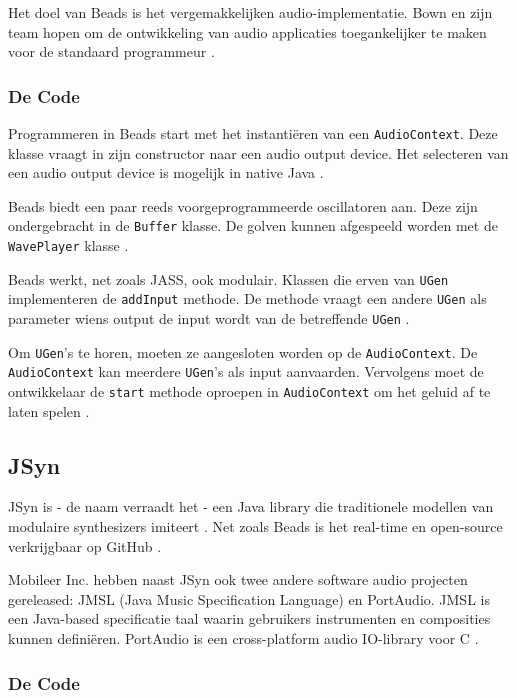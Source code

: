 Het doel van Beads is het vergemakkelijken audio-implementatie. Bown en zijn team hopen om de ontwikkeling van audio applicaties toegankelijker te maken voor de standaard programmeur \autocite{beads2}.

\subsubsection*{De Code}

Programmeren in Beads start met het instantiëren van een \verb+AudioContext+. Deze klasse vraagt in zijn constructor naar een audio output device. Het selecteren van een audio output device is mogelijk in native Java \autocite{beadsdocs}.

Beads biedt een paar reeds voorgeprogrammeerde oscillatoren aan. Deze zijn ondergebracht in de \verb+Buffer+ klasse. De golven kunnen afgespeeld worden met de \verb+WavePlayer+ klasse \autocite{beadsdocs}.

Beads werkt, net zoals JASS, ook modulair. Klassen die erven van \verb+UGen+ implementeren de \verb+addInput+ methode. De methode vraagt een andere \verb+UGen+ als parameter wiens output de input wordt van de betreffende \verb+UGen+ \autocite{beadsdocs}.

Om \verb+UGen+'s te horen, moeten ze aangesloten worden op de \verb+AudioContext+. De \verb+AudioContext+ kan meerdere \verb+UGen+'s als input aanvaarden. Vervolgens moet de ontwikkelaar de \verb+start+ methode oproepen in \verb+AudioContext+ om het geluid af te laten spelen \autocite{beadsdocs}.

\subsection{JSyn}

JSyn is - de naam verraadt het - een Java library die traditionele modellen van modulaire synthesizers imiteert \autocite{jsyn}. Net zoals Beads is het real-time en open-source verkrijgbaar op GitHub \autocite{jsyngit}.

Mobileer Inc. hebben naast JSyn ook twee andere software audio projecten gereleased: JMSL (Java Music Specification Language) en PortAudio. JMSL is een Java-based specificatie taal waarin gebruikers instrumenten en composities kunnen definiëren. PortAudio is een cross-platform audio IO-library voor C \autocite{jsyn}.

\subsubsection*{De Code}


